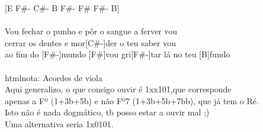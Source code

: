 \documentclass{article}
\begin{document}
[E F#- C#- B F#- F# F#- B]\\
\\
[E]Vou fechar o punho e pôr o sangue a ferver vou \\
[F#-]cerrar os dentes e mor[C#-]der o teu saber vou\\
[B]ao fim do [F#-]mundo [F#]vou gri[F#-]tar lá no teu [B]fundo\\
\\
htmlnota: Acordes de viola\\
Aqui generalizo, o que consigo ouvir é 1xx101,que corresponde \\
apenas a Fº (1+3b+5b) e não Fº7 (1+3b+5b+7bb), que já tem o Ré.\\
Isto não é nada dogmático, tb posso estar a ouvir mal ;)\\
Uma alternativa seria 1x0101.\\
\end{document}
